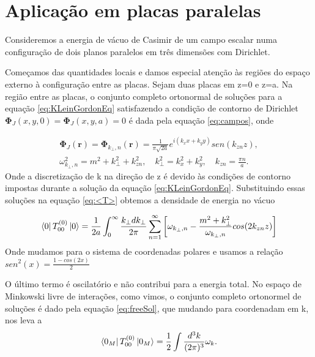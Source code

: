 \section{Aplicação em placas paralelas}

Consideremos a energia de vácuo de Casimir de um campo escalar numa configuração de dois planos paralelos em três dimensões com Dirichlet.

Começamos das quantidades locais e damos especial atenção às regiões do espaço externo à configuração entre as placas. Sejam duas placas em z=0 e z=a.
Na região entre as placas, o conjunto completo ortonormal de soluções para a equação \eqref{eq:KLeinGordonEq} satisfazendo a condição de contorno de Dirichlet $\bm{\Phi}_J(x,y,0)=\bm{\Phi}_J(x,y,a) = 0$ é dada pela equação \eqref{eq:campos}, onde

\begin{equation}
\begin{aligned}
\bm{\Phi}_J(\bm{r})=\bm{\Phi}_{k_\perp, n}(\bm{r}) = \frac{1}{\pi \sqrt{2a}}e^{i(k_xx + k_yy)} sen(k_{zn}z), \\
\omega^2_{k_\perp, n} = m^2 + k_{\perp}^2 + k_{zn}^2, \quad k_{\perp}^2 = k_x^2 + k_y^2, \quad k_{zn} = \frac{\pi n}{a}.
\end{aligned}
\end{equation}
Onde a discretização de k na direção de z é devido às condições de contorno impostas durante a solução da equação \eqref{eq:KLeinGordonEq}. Substituindo essas soluções na equação \eqref{eq:<T>} obtemos a densidade de energia no vácuo 

\begin{equation}
\bra{0} T_{00}^{(0)} \ket{0} = \frac{1}{2a} \int_0^\infty \frac{k_\perp dk_\perp}{2\pi} \sum_{n=1}^\infty  \left[\omega_{k_\perp, n} - \frac{m^2 + k_\perp^2}{\omega_{k_\perp, n}} cos(2k_{zn}z) \right] \label{eq:comPlacas}
\end{equation}
Onde mudamos para o sistema de coordenadas polares e usamos a relação $sen^2(x) = \frac{1-cos(2x)}{2}$

O último termo é oscilatório e não contribui para a energia total. No espaço de Minkowski livre de interações, como vimos, o conjunto completo ortonormel de soluções é dado pela equação \eqref{eq:freeSol}, que mudando para coordenadam em k, nos leva a 
\begin{equation}
\bra{0_M} T_{00}^{(0)} \ket{0_M} = \frac{1}{2} \int \frac{d^3k}{(2\pi)^3} \omega_k . \label{eq:semPlacas}
\end{equation}

